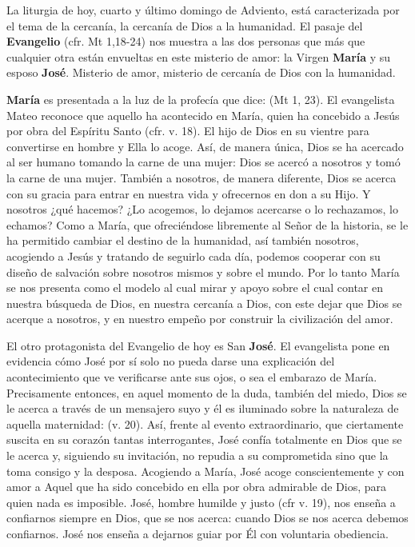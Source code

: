 				\begin{body}
					La liturgia de hoy, cuarto y último domingo de Adviento, está caracterizada por el tema de la cercanía, la cercanía de Dios a la humanidad. El pasaje del \textbf{Evangelio} (cfr. Mt 1,18-24) nos muestra a las dos personas que más que cualquier otra están envueltas en este misterio de amor: la Virgen \textbf{María} y su esposo \textbf{José}. Misterio de amor, misterio de cercanía de Dios con la humanidad.
					
					\textbf{María} es presentada a la luz de la profecía que dice:  (Mt 1, 23). El evangelista Mateo reconoce que aquello ha acontecido en María, quien ha concebido a Jesús por obra del Espíritu Santo (cfr. v. 18). El hijo de Dios  en su vientre para convertirse en hombre y Ella lo acoge. Así, de manera única, Dios se ha acercado al ser humano tomando la carne de una mujer: Dios se acercó a nosotros y tomó la carne de una mujer. También a nosotros, de manera diferente, Dios se acerca con su gracia para entrar en nuestra vida y ofrecernos en don a su Hijo. Y nosotros ¿qué hacemos? ¿Lo acogemos, lo dejamos acercarse o lo rechazamos, lo echamos? Como a María, que ofreciéndose libremente al Señor de la historia, se le ha permitido cambiar el destino de la humanidad, así también nosotros, acogiendo a Jesús y tratando de seguirlo cada día, podemos cooperar con su diseño de salvación sobre nosotros mismos y sobre el mundo. Por lo tanto María se nos presenta como el modelo al cual mirar y apoyo sobre el cual contar en nuestra búsqueda de Dios, en nuestra cercanía a Dios, con este dejar que Dios se acerque a nosotros, y en nuestro empeño por construir la civilización del amor.
					
					El otro protagonista del Evangelio de hoy es San \textbf{José}. El evangelista pone en evidencia cómo José por sí solo no pueda darse una explicación del acontecimiento que ve verificarse ante sus ojos, o sea el embarazo de María. Precisamente entonces, en aquel momento de la duda, también del miedo, Dios se le acerca a través de un mensajero suyo y él es iluminado sobre la naturaleza de aquella maternidad:  (v. 20). Así, frente al evento extraordinario, que ciertamente suscita en su corazón tantas interrogantes, José confía totalmente en Dios que se le acerca y, siguiendo su invitación, no repudia a su comprometida sino que la toma consigo y la desposa. Acogiendo a María, José acoge conscientemente y con amor a Aquel que ha sido concebido en ella por obra admirable de Dios, para quien nada es imposible. José, hombre humilde y justo (cfr v. 19), nos enseña a confiarnos siempre en Dios, que se nos acerca: cuando Dios se nos acerca debemos confiarnos. José nos enseña a dejarnos guiar por Él con voluntaria obediencia.
					

\end{body}
